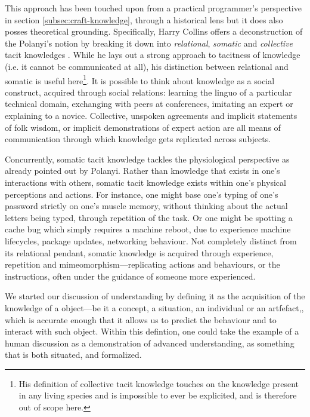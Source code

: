 This approach has been touched upon from a practical programmer's perspective in section \ref{subsec:craft-knowledge}, through a historical lens but it does also posses theoretical grounding. Specifically, Harry Collins offers a deconstruction of the Polanyi's notion by breaking it down into \emph{relational}, \emph{somatic} and \emph{collective} tacit knowledges \citep{collins_tacit_2010}. While he lays out a strong approach to tacitness of knowledge (i.e. it cannot be communicated at all), his distinction between relational and somatic is useful here\footnote{His definition of collective tacit knowledge touches on the knowledge present in any living species and is impossible to ever be explicited, and is therefore out of scope here.}. It is possible to think about knowledge as a social construct, acquired through social relations: learning the linguo of a particular technical domain, exchanging with peers at conferences, imitating an expert or explaining to a novice. Collective, unspoken agreements and implicit statements of folk wisdom, or implicit demonstrations of expert action are all means of communication through which knowledge gets replicated across subjects.

Concurrently, somatic tacit knowledge tackles the physiological perspective as already pointed out by Polanyi. Rather than knowledge that exists in one's interactions with others, somatic tacit knowledge exists within one's physical perceptions and actions. For instance, one might base one's typing of one's password strictly on one's muscle memory, without thinking about the actual letters being typed, through repetition of the task. Or one might be spotting a cache bug which simply requires a machine reboot, due to experience machine lifecycles, package updates, networking behaviour. Not completely distinct from its relational pendant, somatic knowledge is acquired through experience, repetition and mimeomorphism—replicating actions and behaviours, or the instructions, often under the guidance of someone more experienced.

\spacer

We started our discussion of understanding by defining it as the acquisition of the knowledge of a object—be it a concept, a situation, an individual or an artfefact,, which is accurate enough that it allows us to predict the behaviour and to interact with such object. Within this defintion, one could take the example of a human discussion as a demonstration of advanced understanding, as something that is both situated, and formalized.

